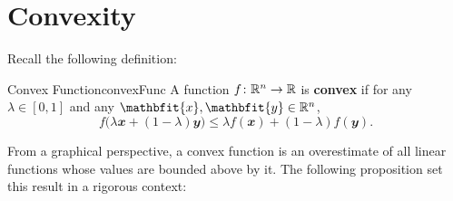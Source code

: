 \documentclass[math, code]{amznotes}
\theoremstyle{remark}
\begin{document}
\section{Convexity}
Recall the following definition:
\begin{dfnbox}{Convex Function}{convexFunc}
    A function $f \colon \mathbb{R}^n \to \mathbb{R}$ is {\color{red} \textbf{convex}} if for any $\lambda \in [0, 1]$ and any $\mathbfit{x}, \mathbfit{y} \in \R^n$,
    \begin{equation*}
        f\bigl(\lambda\mathbfit{x} + \left(1 - \lambda\right)\mathbfit{y}\bigr) \leq \lambda f\left(\mathbfit{x}\right) + \left(1 - \lambda\right)f\left(\mathbfit{y}\right).
    \end{equation*}
\end{dfnbox}
From a graphical perspective, a convex function is an overestimate of all linear functions whose values are bounded above by it. The following proposition set this result in a rigorous context:
\end{document}
